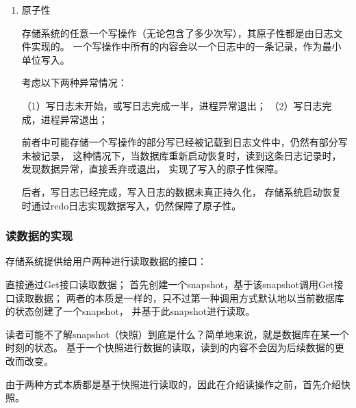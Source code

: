 \begin{enumerate}
		\item 原子性
		
		存储系统的任意一个写操作（无论包含了多少次写），其原子性都是由日志文件实现的。
		一个写操作中所有的内容会以一个日志中的一条记录，作为最小单位写入。

		考虑以下两种异常情况：

		（1）写日志未开始，或写日志完成一半，进程异常退出；
		（2）写日志完成，进程异常退出；

		前者中可能存储一个写操作的部分写已经被记载到日志文件中，仍然有部分写未被记录，
		这种情况下，当数据库重新启动恢复时，读到这条日志记录时，发现数据异常，直接丢弃或退出，
		实现了写入的原子性保障。

		后者，写日志已经完成，写入日志的数据未真正持久化，
		存储系统启动恢复时通过redo日志实现数据写入，仍然保障了原子性。

		\end{enumerate}


		\subsubsection{读数据的实现}

	存储系统提供给用户两种进行读取数据的接口：

	直接通过Get接口读取数据；
	首先创建一个snapshot，基于该snapshot调用Get接口读取数据；
	两者的本质是一样的，只不过第一种调用方式默认地以当前数据库的状态创建了一个snapshot，
	并基于此snapshot进行读取。

	读者可能不了解snapshot（快照）到底是什么？简单地来说，就是数据库在某一个时刻的状态。
	基于一个快照进行数据的读取，读到的内容不会因为后续数据的更改而改变。
	
	由于两种方式本质都是基于快照进行读取的，因此在介绍读操作之前，首先介绍快照。

